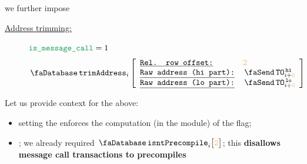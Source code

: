 	we further impose
	\begin{description}
		\item[\underline{Address trimming:}]
			\If $\locIsMessageCallTransaction = 1$
			\[
				\accTrimAddress
				{i}{\roffTxSkipUserRecipientAccount}
				{\txTo  \high  _{i + \roffTxSkipUserTransaction}}
				{\txTo  \low   _{i + \roffTxSkipUserTransaction}}
			\]
	\end{description}
	\saNote{}
	Let us provide context for the above:
	\begin{itemize}
		\item
			setting the \accTrmFlag{} enforces the computation (in the \trmMod{} module) of the \accTrmIsPrecompile{} flag;
		\item \label{warning: no message calls to precompiles};
			we already required $\accIsntPrecompile {i}{\roffTxSkipUserRecipientAccount}$;
			this \textbf{disallows message call transactions to precompiles}
	\end{itemize}
